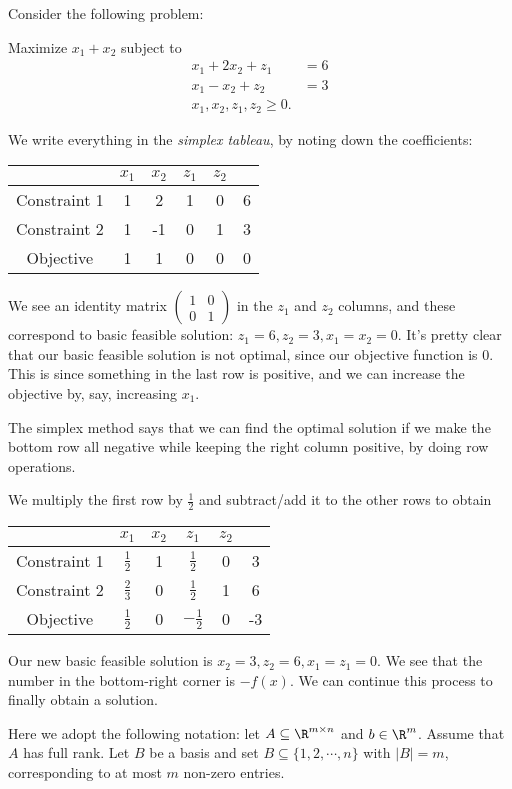 \documentclass[a4paper]{article}
\begin{document}
\begin{eg}
  Consider the following problem:
  \begin{center}
    Maximize $x_1 + x_2$ subject to
    \begin{align*}
      x_1 + 2x_2 + z_1 &= 6\\
      x_1 - x_2 + z_2 &= 3\\
      x_1, x_2, z_1, z_2 \geq 0.
    \end{align*}
  \end{center}
  We write everything in the \emph{simplex tableau}, by noting down the coefficients:
  \begin{center}
    \begin{tabular}{cccccc}
      \toprule
      &$x_1$ & $x_2$ & $z_1$ & $z_2$ \\
      \midrule
      Constraint 1 & 1 & 2 & 1 & 0 & 6 \\
      Constraint 2 & 1 & -1 & 0 & 1 & 3 \\
      Objective & 1 & 1 & 0 & 0 & 0 \\
      \bottomrule
    \end{tabular}
  \end{center}
  We see an identity matrix $\begin{pmatrix} 1 & 0\\ 0 & 1\end{pmatrix}$ in the $z_1$ and $z_2$ columns, and these correspond to basic feasible solution: $z_1 = 6, z_2 = 3, x_1 = x_2 = 0$. It's pretty clear that our basic feasible solution is not optimal, since our objective function is $0$. This is since something in the last row is positive, and we can increase the objective by, say, increasing $x_1$.

  The simplex method says that we can find the optimal solution if we make the bottom row all negative while keeping the right column positive, by doing row operations.

  We multiply the first row by $\frac{1}{2}$ and subtract/add it to the other rows to obtain
  \begin{center}
    \begin{tabular}{cccccc}
      \toprule
      &$x_1$ & $x_2$ & $z_1$ & $z_2$ & \\
      \midrule
      Constraint 1 & $\frac{1}{2}$ & 1 & $\frac{1}{2}$ & 0 & 3 \\
      Constraint 2 & $\frac{2}{3}$ & 0 & $\frac{1}{2}$ & 1 & 6 \\
      Objective & $\frac{1}{2}$ & 0 & $-\frac{1}{2}$ & 0 & -3\\
      \bottomrule
    \end{tabular}
  \end{center}
  Our new basic feasible solution is $x_2 = 3, z_2 = 6, x_1 = z_1 = 0$. We see that the number in the bottom-right corner is $-f(x)$. We can continue this process to finally obtain a solution.
\end{eg}
Here we adopt the following notation: let $A\subseteq \R^{m\times n}$ and $b\in \R^m$. Assume that $A$ has full rank. Let $B$ be a basis and set $B\subseteq \{1, 2, \cdots, n\}$ with $|B| = m$, corresponding to at most $m$ non-zero entries.
\end{document}
